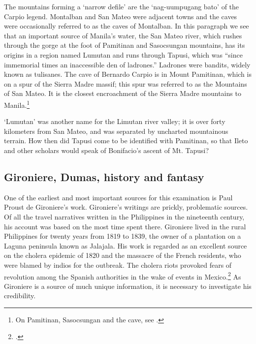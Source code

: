 The mountains forming a \enquote*{narrow defile} are the \enquote*{nag-uumpugang bato} of the Carpio legend. Montalban and San Mateo were adjacent towns and the caves were occasionally referred to as the caves of Montalban. In this paragraph we see that an important source of Manila's water, the San Mateo river, which rushes through the gorge at the foot of Pamitinan and Sasocsungan mountains, has its origins in a region named Lumutan and runs through Tapusi, which was \enquote{since immemorial times an inaccessible den of ladrones.} Ladrones were bandits, widely known as tulisanes. The cave of Bernardo Carpio is in Mount Pamitinan, which is on a spur of the Sierra Madre massif; this spur was referred to as the Mountains of San Mateo. It is the closest encroachment of the Sierra Madre mountains to Manila.\footnote{On Pamitinan, Sasocsungan and the cave, see \cite[s.v Pamitinan; s.v. Mateo (San)]{Buzeta1850}.}

\enquote*{Lumutan} was another name for the Limutan river valley; it is over forty kilometers from San Mateo, and was separated by uncharted mountainous terrain. How then did Tapusi come to be identified with Pamitinan, so that Ileto and other scholars would speak of Bonifacio's ascent of Mt. Tapusi?

\subsection{Gironiere, Dumas, history and fantasy}

One of the earliest and most important sources for this examination is Paul Proust de Gironiere's work. Gironiere's writings are prickly, problematic sources.  Of all the travel narratives written in the Philippines in the nineteenth century, his account was based on the most time spent there. Gironiere lived in the rural Philippines for twenty years from 1819 to 1839, the owner of a plantation on a Laguna peninsula known as Jalajala. His work is regarded as an excellent source on the cholera epidemic of 1820 and the massacre of the French residents, who were blamed by indios for the outbreak. The cholera riots provoked fears of revolution among the Spanish authorities in the wake of events in Mexico.\footcite[29]{DeBevoise1995} As Gironiere is a source of much unique information, it is necessary to investigate his credibility.

